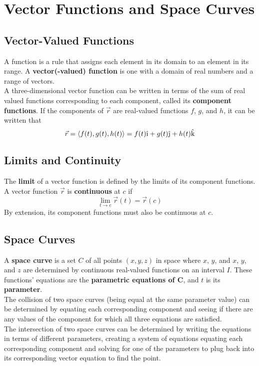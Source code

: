 \documentclass[../Calculus_\Roman{3}]{subfiles}
\begin{document}
	\section{Vector Functions and Space Curves}
		\subsection*{Vector-Valued Functions}
			A function is a rule that assigns each element in its domain to an element in its range. A \textbf{vector(-valued) function} is one with a domain of real numbers and a range of vectors. \\
			A three-dimensional vector function can be written in terms of the sum of real valued functions corresponding to each component, called its \textbf{component functions}. If the components of $\vec{r}$ are real-valued functions $f$, $g$, and $h$, it can be written that
				\[\vec{r} = \langle f(t), g(t), h(t) \rangle = f(t)\vi + g(t)\vj + h(t)\vk\]
		\subsection*{Limits and Continuity}
				The \textbf{limit} of a vector function is defined by the limits of its component functions.
				A vector function $\vec{r}$ is \textbf{continuous} at $c$ if	
					\[\lim_{t\to c}\vec{r}(t) = \vec{r}(c)\]
				By extension, its component functions must also be continuous at $c$.
		\subsection*{Space Curves}
			A \textbf{space curve} is a set $C$ of all points $(x, y, z)$ in space where $x$, $y$, and $x$, $y$, and $z$ are determined by continuous real-valued functions on an interval $I$. These functions' equations are the \textbf{parametric equations of $\bm{C}$}, and $t$ is its \textbf{parameter}. \\
			The collision of two space curves (being equal at the same parameter value) can be determined by equating each corresponding component and seeing if there are any values of the component for which all three equations are satisfied. \\
			The intersection of two space curves can be determined by writing the equations in terms of different parameters, creating a system of equations equating each corresponding component and solving for one of the parameters to plug back into its corresponding vector equation to find the point.
\end{document}
